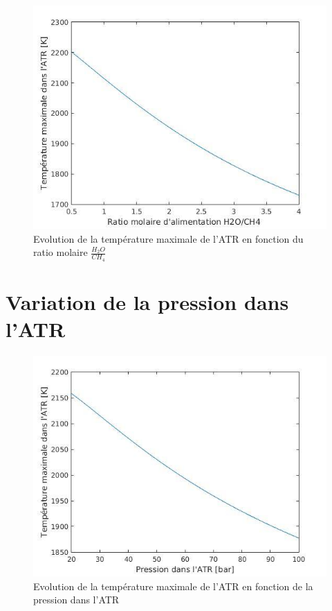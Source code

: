 \documentclass[12pt]{report}
\begin{document}
\begin{figure}[H]
\begin{center}
\includegraphics[scale=0.6]{Tmax_ratio_H2O}
\caption{Evolution de la température maximale de l'ATR en fonction du ratio molaire $\frac{H_2O}{CH_4}$}
\end{center}
\end{figure}

\section{Variation de la pression dans l'ATR}

\begin{figure}[H]
\begin{center}
\includegraphics[scale=0.6]{Tmax_pression_ATR}
\caption{Evolution de la température maximale de l'ATR en fonction de la pression dans l'ATR}
\end{center}
\end{figure}
\end{document}
